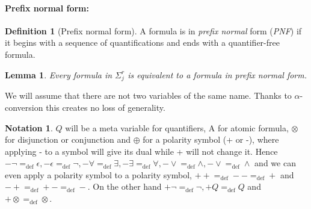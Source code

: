 \documentclass[a4paper,12pt]{article}
\newcommand{\emphdex}[1]{\index{#1}\emph{#1}}
\newtheorem{lemma}[theorem]{Lemma}
\theoremstyle{definition}
\newtheorem{definition}[theorem]{Definition}
\newtheorem{notation}[theorem]{Notation}
\newcommand{\hob}[2]{\ensuremath{\Sigma^{#1}_{#2}}}
\newcommand{\ed}{=_{\mathrm{def}}}
\begin{document}
\paragraph{Prefix normal form:}
\begin{definition}[Prefix normal form]
  A formula is in \emphdex{prefix normal} form (\emphdex{PNF}) if it begins with a
  sequence of quantifications and ends with a quantifier-free formula.
\end{definition}
\begin{lemma}\label{pnf}
  Every formula in $\hob{r}{j}$ is equivalent to a formula in prefix
  normal form. 
\end{lemma}
We will assume that there are not two variables of the same
  name. Thanks to $\alpha$-conversion this creates no loss of
  generality.
\begin{notation}
  $Q$ will be a meta variable for quantifiers, A for atomic formula,
  $\otimes$ for disjunction or conjunction and $\oplus$ for a polarity
  symbol (+ or -), where applying - to a symbol will give its dual
  while + will not change it. Hence $-\neg\ed\epsilon,
  -\epsilon\ed\neg, -\forall\ed\exists, -\exists\ed\forall,
  -\lor\ed\land,-\lor\ed\land$ and we can even apply a polarity symbol
  to a polarity symbol, $++\ed--\ed+$ and $-+\ed+-\ed-$. On the other hand
  $+\neg\ed\neg, +Q\ed Q$ and $+\otimes\ed\otimes$.
\end{notation}
\end{document}
